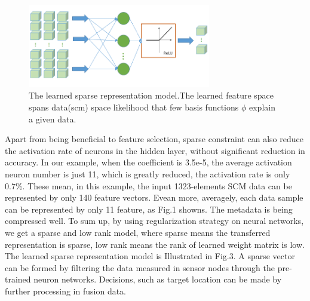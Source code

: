 

\begin{figure}
\includegraphics[width=8cm]{figure/sparse_represention_model}
\caption{The learned sparse representation model.The learned feature space spans data(scm) space likelihood that few basis functions $\phi$ explain a given data.}
\end{figure}

Apart from being beneficial to feature selection, sparse constraint can also reduce the activation rate of neurons in the hidden layer, without significant reduction in accuracy. In our example, when the coefficient is 3.5e-5, the average activation neuron number is just 11, which is greatly reduced, the activation rate is only 0.7{\%}.
These mean, in this example, the input 1323-elements SCM  data can be represented by only 140 feature vectors. Evean more, averagely, each data sample can be represented by only 11 feature, as Fig.1 showns. The metadata is being compressed well. To sum up, by using regularization strategy on neural networks, we get a sparse and low rank model, where sparse means the transferred representation is sparse, low rank means the rank of learned weight matrix is low. The learned sparse representation model is Illustrated in Fig.3.
A sparse vector can be formed by filtering the data measured in sensor nodes through the pre-trained neuron networks. Decisions, such as target location can be made by further processing in fusion data.

